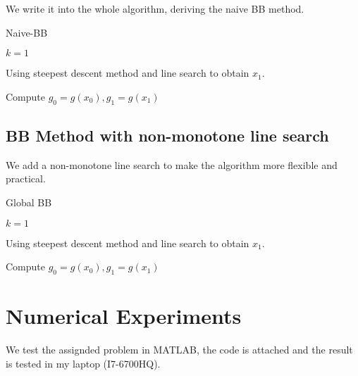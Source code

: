 \documentclass{article}
\begin{document}
We write it into the whole algorithm, deriving the naive BB method. 
\begin{algorithm}
	\caption{Naive-BB}
	
	$k = 1$
	
	Using steepest descent method and line search to obtain $x_1$.
	
	Compute $g_0 = g(x_0), g_1 = g(x_1)$
	
\end{algorithm}
\subsection{BB Method with non-monotone line search}
We add a non-monotone line search to make the algorithm more flexible and practical.
\begin{algorithm}[H]
	\caption{Global BB}
	
	$k = 1$
	
	Using steepest descent method and line search to obtain $x_1$.
	
	Compute $g_0 = g(x_0), g_1 = g(x_1)$
	
\end{algorithm}
\section{Numerical Experiments}
We test the assignded problem in MATLAB, the code is attached and the result is tested in my laptop (I7-6700HQ).
\end{document}
